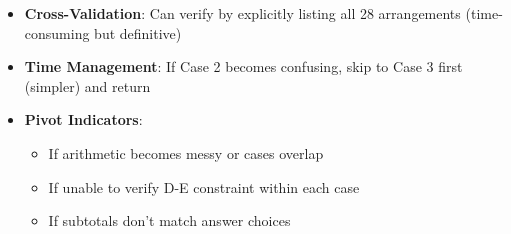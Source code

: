 \documentclass[]{article}
\begin{document}
\begin{solutionbox}
\begin{itemize}[leftmargin=*]
    \item \textbf{Cross-Validation}: Can verify by explicitly listing all 28 arrangements (time-consuming but definitive)
    
    \item \textbf{Time Management}: If Case 2 becomes confusing, skip to Case 3 first (simpler) and return
    
    \item \textbf{Pivot Indicators}: 
    \begin{itemize}
        \item If arithmetic becomes messy or cases overlap
        \item If unable to verify D-E constraint within each case
        \item If subtotals don't match answer choices
    \end{itemize}
\end{itemize}
\end{solutionbox}
\end{document}
